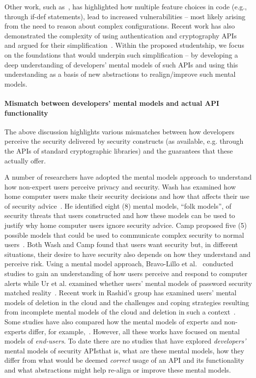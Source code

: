 \documentclass[10pt]{article}
\begin{document}
Other work, such as~\cite{ferreira2016}, has highlighted how multiple feature choices in code (e.g., through if-def statements), lead to increased vulnerabilities -- most likely arising from the need to reason about complex configurations.
Recent work has also demonstrated the complexity of using authentication and cryptography APIs~\cite{acar2017} and argued for their simplification~\cite{arzt2015, nadi2016}. Within the proposed studentship, we focus on the foundations that would underpin such simplification -- by developing a deep understanding of developers' mental models of such APIs and using this understanding as a basis of new abstractions to realign/improve such mental models.

\paragraph{Mismatch between developers' mental models and actual API functionality}
The above discussion highlights various mismatches between how developers perceive the security delivered by security constructs (as available, e.g. through the APIs of standard cryptographic libraries) and the guarantees that these actually offer. 

A number of researchers have adopted the mental models approach to understand how non-expert users perceive privacy and security. Wash has examined how home computer users make their security decisions and how that affects their use of security advice~\cite{wash2010folk}. He identified eight (8) mental models, ``folk models'', of security threats that users constructed and how these models can be used to justify why home computer users ignore security advice. Camp proposed five (5) possible models that could be used to communicate complex security to normal users~\cite{camp2009mental}. Both Wash and Camp found that users want security but, in different situations, their desire to have security also depends on how they understand and perceive risk. Using a mental model approach, Bravo-Lillo et al.~\cite{bravo2011bridging} conducted studies to gain an understanding of how users perceive and respond to computer alerts while Ur et al. examined whether users' mental models of password security matched reality~\cite{ur2016users}. Recent work in Rashid's group has examined users' mental models of deletion in the cloud and the challenges and coping strategies resulting from incomplete mental models of the cloud and deletion in such a context~\cite{ramokapane2017}. Some studies have also compared how the mental models of experts and non-experts differ, for example,~\cite{ion2015no}. However, all these works have focused on mental models of \emph{end-users}. To date there are no studies that have explored \emph{developers'} mental models of security APIs\textemdash that is, what are these mental models, how they differ from what would be deemed \emph{correct} usage of an API and its functionality and what abstractions might help re-align or improve these mental models.  
\end{document}
